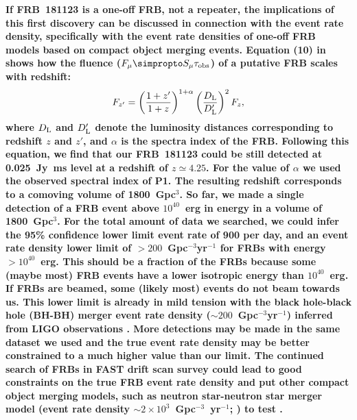 {\bf 
If FRB~181123 is a one-off FRB, not a repeater, the implications of this first discovery can be discussed in connection with the event rate density, specifically with the event rate densities of one-off FRB models based on compact object merging events. 
Equation (10) in \citet{zhang18} shows how the fluence ($F_{\mu}\simpropto  S_{\mu}\tau_{\rm obs}$) of a putative FRB scales with redshift: \begin{equation}
    F_{z'} = \left(\frac{1+z'}{1+z}\right)^{1+\alpha}\left(\frac{D_{\rm L}}{D_{\rm L}'}\right)^2F_{z},
\end{equation} 
where $D_{\rm L}$ and $D_{\rm L}'$ denote the luminosity distances corresponding to redshift $z$ and $z'$, and $\alpha$ is the spectra index of the FRB.
Following this equation, we find that our FRB~181123 could be still detected at 0.025~Jy~ms level at a redshift of $z\simeq4.25$. 
For the value of $\alpha$ we used the observed spectral index of P1.
The resulting redshift corresponds to a comoving volume of 1800~Gpc$^3$. 
So far, we made a single detection of a FRB event above $10^{40}$~erg in energy in a volume of 1800~Gpc$^3$. 
For the total amount of data we searched, we could infer the 95\% confidence lower limit event rate of 900 per day, and an event rate density lower limit of $>200$~Gpc$^{-3}$yr$^{-1}$ for FRBs with energy $>10^{40}$~erg. 
This should be a fraction of the FRBs because some (maybe most) FRB events have a lower isotropic energy than $10^{40}$~erg. If FRBs are beamed, some (likely most) events do not beam towards us. 
This lower limit is already in mild tension with the black hole-black hole (BH-BH) merger event rate density ($\sim 200$~Gpc$^{-3}$yr$^{-1}$) inferred from LIGO observations \citep{mg18}. More detections may be made in the same dataset we used and the true event rate density may be better constrained to a much higher value than our limit. 
The continued search of FRBs in FAST drift scan survey could lead to good constraints on the true FRB event rate density \citep{lml+20} and put other compact object merging models, such as neutron star-neutron star merger model (event rate density $\sim 2\times10^3$~Gpc$^{-3}$~yr$^{-1}$; \citet{aaa+17}) to test \citep[see also][]{wang20}.

}



